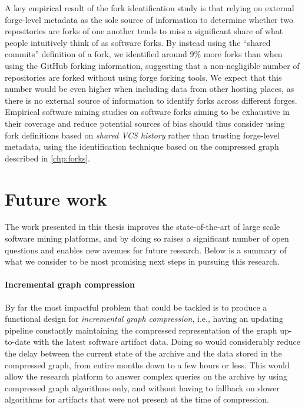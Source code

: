 A key empirical result of the fork identification study is that relying on
external forge-level metadata as the sole source of information to determine
whether two repositories are forks of one another tends to miss a
significant share of what people intuitively think of as software forks.
By instead using the ``shared commits'' definition of a fork, we identified
around 9\% more forks than when using the GitHub forking information,
suggesting that a non-negligible number of repositories are forked without
using forge forking tools. We expect that this number would be even higher when
including data from other hosting places, as there is no external source of
information to identify forks across different forges. Empirical software
mining studies on software forks aiming to be exhaustive in their coverage and
reduce potential sources of bias should thus consider using fork definitions
based on \emph{shared \gls{VCS} history} rather than trusting forge-level
metadata, using the identification technique based on the compressed graph
described in \cref{chp:forks}.

\section{Future work}

The work presented in this thesis improves the state-of-the-art of large scale
software mining platforms, and by doing so raises a significant number of open
questions and enables new avenues for future research. Below is a summary of
what we consider to be most promising next steps in pursuing this research.

\paragraph*{Incremental graph compression}

By far the most impactful problem that could be tackled is to produce a
functional design for \emph{incremental graph compression}, i.e., having an
updating pipeline constantly maintaining the compressed representation of the
graph up-to-date with the latest software artifact data. Doing so would
considerably reduce the delay between the current state of the archive and the
data stored in the compressed graph, from entire months down to a few hours or
less. This would allow the research platform to answer complex queries on the
archive by using compressed graph algorithms only, and without having to
fallback on slower algorithms for artifacts that were not present at the time
of compression.

